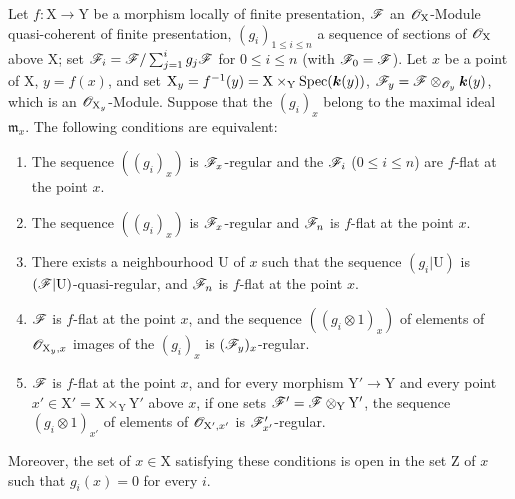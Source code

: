 \begin{theorem}[11.3.8]
\label{IV.11.3.8}
Let $f:\mathrm{X}\to\mathrm{Y}$ be a morphism locally of finite presentation, $\mathscr{F}$ an $\mathscr{O}_\mathrm{X}$-Module quasi-coherent of finite presentation, $(g_i)_{1\leqslant i\leqslant n}$ a sequence of sections of $\mathscr{O}_\mathrm{X}$ above $\mathrm{X}$; set $\mathscr{F}_i=\mathscr{F}/\sum_{j=1}^{i}g_j\mathscr{F}$ for $0\leqslant i\leqslant n$ (with $\mathscr{F}_0=\mathscr{F}$). Let $x$ be a point of $\mathrm{X}$, $y=f(x)$, and set $\mathrm{X}_y=f^{-1}(y)=\mathrm{X}\times_\mathrm{Y}\operatorname{Spec}(\boldsymbol{k}(y))$, $\mathscr{F}_y=\mathscr{F}\otimes_{\mathscr{O}_y}\boldsymbol{k}(y)$, which is an $\mathscr{O}_{\mathrm{X}_y}$-Module. Suppose that the $(g_i)_x$ belong to the maximal ideal $\mathfrak{m}_x$. The following conditions are equivalent:
\begin{enumerate}[label=\emph{\alph*)}]
  \item The sequence $((g_i)_x)$ is $\mathscr{F}_x$-regular and the $\mathscr{F}_i$ ($0\leqslant i\leqslant n$) are $f$-flat at the point $x$.
  \item The sequence $((g_i)_x)$ is $\mathscr{F}_x$-regular and $\mathscr{F}_n$ is $f$-flat at the point $x$.
  \item[\emph{b$'$)}] There exists a neighbourhood $\mathrm{U}$ of $x$ such that the sequence $(g_i|\mathrm{U})$ is $(\mathscr{F}|\mathrm{U})$-quasi-regular, and $\mathscr{F}_n$ is $f$-flat at the point $x$.
  \item $\mathscr{F}$ is $f$-flat at the point $x$, and the sequence $((g_i\otimes 1)_x)$ of elements of $\mathscr{O}_{\mathrm{X}_y,x}$ images of the $(g_i)_x$ is $(\mathscr{F}_y)_x$-regular.
  \item $\mathscr{F}$ is $f$-flat at the point $x$, and for every morphism $\mathrm{Y}'\to\mathrm{Y}$ and every point $x'\in\mathrm{X}'=\mathrm{X}\times_\mathrm{Y}\mathrm{Y}'$ above $x$, if one sets $\mathscr{F}'=\mathscr{F}\otimes_\mathrm{Y}\mathrm{Y}'$, the sequence $(g_i\otimes 1)_{x'}$ of elements of $\mathscr{O}_{\mathrm{X}',x'}$ is $\mathscr{F}'_{x'}$-regular.
\end{enumerate}
Moreover, the set of $x\in\mathrm{X}$ satisfying these conditions is open in the set $\mathrm{Z}$ of $x$ such that $g_i(x)=0$ for every $i$.
\end{theorem}

